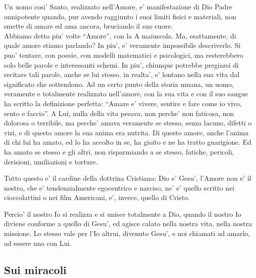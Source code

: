Un uomo cosi' Santo, realizzato nell'Amore, e' manifestazione di Dio Padre onnipotente quando, pur avendo raggiunto i suoi limiti fisici e materiali, non smette di amare ed ama ancora, bruciando il suo cuore. \\

Abbiamo detto piu' volte ``Amore'', con la A maiuscola. Ma, esattamente, di quale amore stiamo parlando? In piu', e' veramente impossibile descriverlo. Si puo' tentare, con poesie, con modelli matematici e psicologici, ma resterebbero solo belle parole e interessanti schemi. In piu', chiunque potrebbe pregiarsi di recitare tali parole, anche se lui stesso, in realta', e' lontano nella sua vita dal significato che sottendono. Ad un certo punto della storia umana, un uomo, veramente e totalmente realizzato nell'amore, con la sua vita e con il suo sangue ha scritto la definizione perfetta: ``Amare e' vivere, sentire e fare come io vivo, sento e faccio''.
A Lui, nulla della vita pesava, non perche' non faticosa, non dolorosa o terribile, ma perche' amava veramente se stesso, senza lacune, difetti o vizi, e di questo amore la sua anima era nutrita. Di questo amore, anche l'anima di chi lui ha amato, ed lo ha accolto in se, ha gioito e ne ha tratto guarigione.
Ed ha amato se stesso e gli altri, non risparmiando a se stesso, fatiche, pericoli, derisioni, umiliazioni e torture.

Tutto questo e' il cardine della dottrina Cristiana: Dio e' Gesu', l'Amore non e' il nostro, che e' tendenzialmente egocentrico e narciso, ne' e' quello scritto nei cioccolattini o nei film Americani, e', invece, quello di Cristo.

Percio' il nostro Io si realizza e si unisce totalmente a Dio, quando il nostro Io diviene conforme a quello di Gesu', ed agisce calato nella nostra vita, nella nostra missione.
Lo stesso vale per l'Io altrui, divenuto Gesu', e noi chiamati ad amarlo, ad essere uno con Lui.\\

\subsection{Sui miracoli}
\label{SuiMiracoli}

